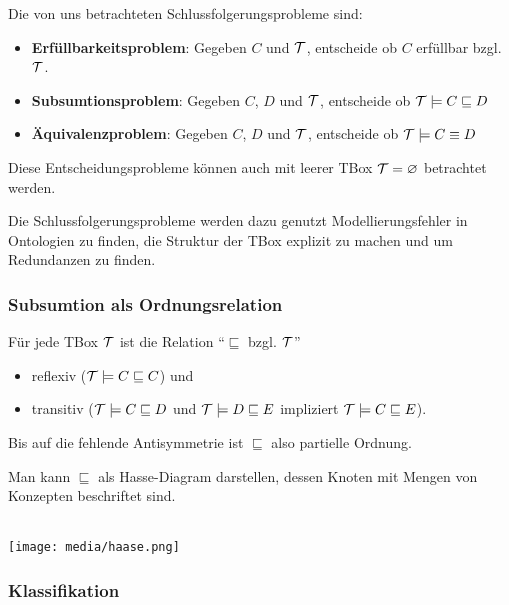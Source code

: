Die von uns betrachteten Schlussfolgerungsprobleme sind:

\begin{itemize}
  \item \textbf{Erfüllbarkeitsproblem}: Gegeben $C$ und $\mathcal{T}$, entscheide ob $C$ erfüllbar bzgl. $\mathcal{T}$.
  \item \textbf{Subsumtionsproblem}: Gegeben $C$, $D$ und $\mathcal{T}$, entscheide ob $\mathcal{T} \models C \sqsubseteq D$
  \item \textbf{Äquivalenzproblem}: Gegeben $C$, $D$ und $\mathcal{T}$, entscheide ob $\mathcal{T} \models C \equiv D$
\end{itemize}

Diese Entscheidungsprobleme können auch mit leerer TBox $\mathcal{T} = \varnothing$ betrachtet werden.

Die Schlussfolgerungsprobleme werden dazu genutzt Modellierungsfehler in Ontologien zu finden, die Struktur der TBox explizit zu machen und um Redundanzen zu finden.

\subsubsection{Subsumtion als Ordnungsrelation}\label{subordn}

\begin{lemma}
    Für jede TBox $\mathcal{T}$ ist die Relation \enquote{$\sqsubseteq$ bzgl. $\mathcal{T}$}

\begin{itemize}
  \item reflexiv ($\mathcal{T} \models C \sqsubseteq C$) und
  \item transitiv ($\mathcal{T} \models C \sqsubseteq D$ und $\mathcal{T} \models D \sqsubseteq E$ impliziert $\mathcal{T} \models C \sqsubseteq E$).
\end{itemize}
Bis auf die fehlende Antisymmetrie ist $\sqsubseteq$ also partielle Ordnung.
\end{lemma}


Man kann $\sqsubseteq$ als Hasse-Diagram darstellen, dessen Knoten mit Mengen von Konzepten beschriftet sind.

\begin{tafel}\mbox{}\\
\texttt{[image: media/haase.png]}
\end{tafel}

\subsubsection{Klassifikation}

